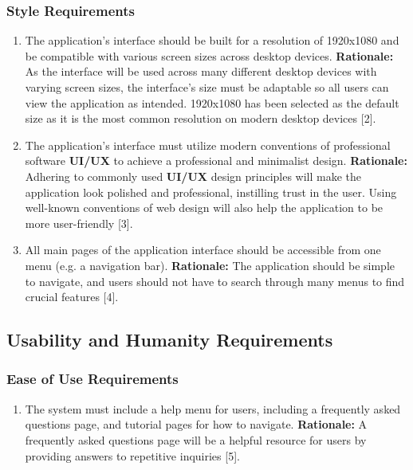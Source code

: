 \documentclass[]{article}
\begin{document}
\subsubsection{Style Requirements}
\label{ssub:style_requirements}
\begin{enumerate}[{LF-S}1. ]
	\item The application's interface should be built for a resolution of 1920x1080 and be compatible with various screen sizes across desktop devices.\newline
	{\bf Rationale:} As the interface will be used across many different desktop devices with varying screen sizes, the interface's size must be adaptable so all users can view the application as intended. 1920x1080 has been selected as the default size as it is the most common resolution on modern desktop devices [2].
	\item The application's interface must utilize modern conventions of professional software \textbf{UI/UX} to achieve a professional and minimalist design.\newline
	{\bf Rationale:} Adhering to commonly used \textbf{UI/UX} design principles will make the application look polished and professional, instilling trust in the user. Using well-known conventions of web design will also help the application to be more user-friendly [3].
	\item All main pages of the application interface should be accessible from one menu (e.g. a navigation bar).\newline
	{\bf Rationale:} The application should be simple to navigate, and users should not have to search through many menus to find crucial features [4].
\end{enumerate}


\subsection{Usability and Humanity Requirements}
\label{sub:usability_and_humanity_requirements}

\subsubsection{Ease of Use Requirements}
\label{ssub:ease_of_use_requirements}
\begin{enumerate}[{UH-EOU}1. ]
	\item The system must include a help menu for users, including a frequently asked questions page, and tutorial pages for how to navigate.\newline
	{\bf Rationale:} A frequently asked questions page will be a helpful resource for users by providing answers to repetitive inquiries [5].
\end{enumerate}
\end{document}
